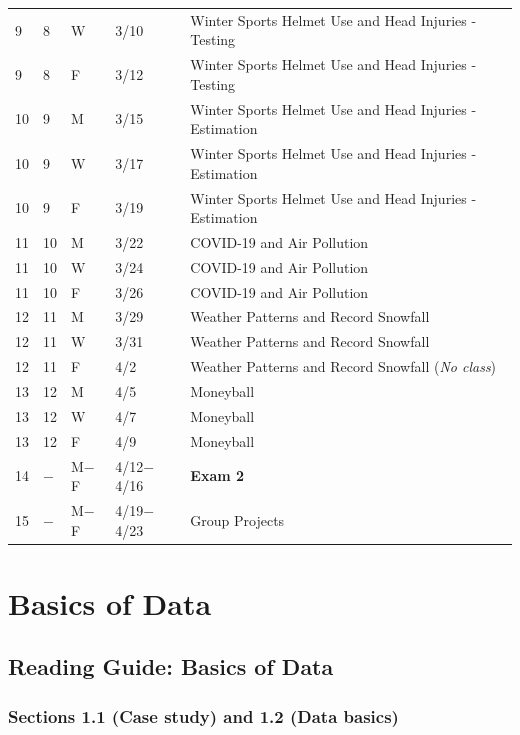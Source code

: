 \documentclass[
]{report}
\begin{document}
\begin{longtable}{|l|l|l|l|p{}|}
9& 8& W& 3/10& Winter Sports Helmet Use and Head Injuries - Testing \\* 
9& 8& F& 3/12& Winter Sports Helmet Use and Head Injuries - Testing \\ \hline
10& 9& M& 3/15& Winter Sports Helmet Use and Head Injuries - Estimation \\*
10& 9& W& 3/17& Winter Sports Helmet Use and Head Injuries - Estimation \\*
10& 9& F& 3/19& Winter Sports Helmet Use and Head Injuries - Estimation \\ \hline
11& 10& M& 3/22& COVID-19 and Air Pollution \\*
11& 10& W& 3/24& COVID-19 and Air Pollution \\* 
11& 10& F& 3/26& COVID-19 and Air Pollution \\ \hline
12& 11& M& 3/29& Weather Patterns and Record Snowfall \\*
12& 11& W& 3/31& Weather Patterns and Record Snowfall \\*
12& 11& F& 4/2& Weather Patterns and Record Snowfall  (\textit{No class})\\ \hline
13& 12& M& 4/5& Moneyball \\*
13& 12& W& 4/7& Moneyball \\*
13& 12& F& 4/9& Moneyball \\ \hline
14& $-$& M$-$F& 4/12$-$4/16& \textbf{Exam 2} \\ \hline
15& $-$& M$-$F& 4/19$-$4/23& Group Projects \\ \hline
\end{longtable}

\hypertarget{basics-of-data}{%
\chapter{Basics of Data}\label{basics-of-data}}

\hypertarget{reading-guide-basics-of-data}{%
\section{Reading Guide: Basics of Data}\label{reading-guide-basics-of-data}}

\hypertarget{sections-1.1-case-study-and-1.2-data-basics}{%
\subsection*{Sections 1.1 (Case study) and 1.2 (Data basics)}\label{sections-1.1-case-study-and-1.2-data-basics}}
\end{document}
